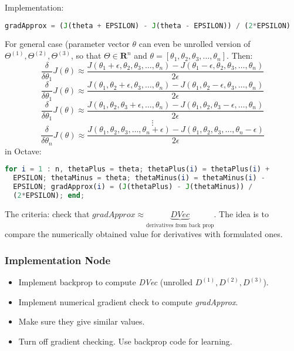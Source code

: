 \documentclass{scrartcl}
\begin{document}
Implementation:
\begin{lstlisting}[language=Octave]
  gradApprox = (J(theta + EPSILON) - J(theta - EPSILON)) / (2*EPSILON)
\end{lstlisting}
For general case (parameter vector $\theta$ can even be unrolled
version of $\Theta^{(1)}, \Theta^{(2)}, \Theta^{(3)}$, so that $\Theta
\in \mathbf{R}^n$ and $\theta = \left[\theta_1, \theta_2, \theta_3,
  \dots, \theta_n \right]$. Then:
\[ \frac{\delta}{\delta \theta_1} J(\theta) \approx \frac{J(\theta_1 +
  \epsilon, \theta_2, \theta_3, \dots, \theta_n) - J(\theta_1 -
  \epsilon, \theta_2, \theta_3, \dots, \theta_n)}{2 \epsilon} \]
\[ \frac{\delta}{\delta \theta_1} J(\theta) \approx \frac{J(\theta_1,
  \theta_2 + \epsilon, \theta_3, \dots, \theta_n) - J(\theta_1,
  \theta_2 - \epsilon, \theta_3, \dots, \theta_n)}{2 \epsilon} \]
\[ \frac{\delta}{\delta \theta_1} J(\theta) \approx \frac{J(\theta_1,
  \theta_2, \theta_3 + \epsilon, \dots, \theta_n) - J(\theta_1,
  \theta_2, \theta_3 - \epsilon, \dots, \theta_n)}{2 \epsilon} \]
\[ \vdots \]
\[ \frac{\delta}{\delta \theta_n} J(\theta) \approx \frac{J(\theta_1,
  \theta_2, \theta_3, \dots, \theta_n + \epsilon) - J(\theta_1,
  \theta_2, \theta_3, \dots, \theta_n - \epsilon)}{2 \epsilon} \] in
Octave:
\begin{lstlisting}[language=Octave]
  for i = 1 : n, thetaPlus = theta; thetaPlus(i) = thetaPlus(i) +
  EPSILON; thetaMinus = theta; thetaMinus(i) = thetaMinus(i) -
  EPSILON; gradApprox(i) = (J(thetaPlus) - J(thetaMinus)) /
  (2*EPSILON); end;
\end{lstlisting}

The criteria: check that $gradApprox \approx \underbrace{
  DVec}_{\textrm{derivatives from back prop}}$. The idea is to compare
the numerically obtained value for derivatives with formulated ones.

\subsubsection{Implementation Node}
\begin{itemize}
\item Implement backprop to compute {\it DVec} (unrolled $D^{(1)},
  D^{(2)}, D^{(3)}$).
\item Implement numerical gradient check to compute {\it gradApprox}.
\item Make sure they give similar values.
\item Turn off gradient checking. Use backprop code for learning.
\end{itemize}
\end{document}
